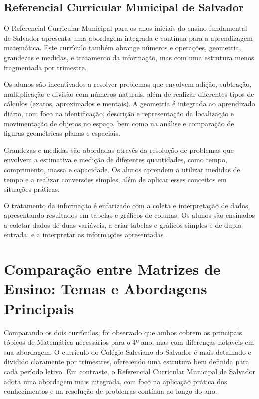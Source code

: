 \subsection{Referencial Curricular Municipal de Salvador}

O Referencial Curricular Municipal para os anos iniciais do ensino fundamental de Salvador apresenta uma abordagem integrada e contínua para a aprendizagem matemática. Este currículo também abrange números e operações, geometria, grandezas e medidas, e tratamento da informação, mas com uma estrutura menos fragmentada por trimestre.

Os alunos são incentivados a resolver problemas que envolvem adição, subtração, multiplicação e divisão com números naturais, além de realizar diferentes tipos de cálculos (exatos, aproximados e mentais). A geometria é integrada ao aprendizado diário, com foco na identificação, descrição e representação da localização e movimentação de objetos no espaço, bem como na análise e comparação de figuras geométricas planas e espaciais.

Grandezas e medidas são abordadas através da resolução de problemas que envolvem a estimativa e medição de diferentes quantidades, como tempo, comprimento, massa e capacidade. Os alunos aprendem a utilizar medidas de tempo e a realizar conversões simples, além de aplicar esses conceitos em situações práticas.

O tratamento da informação é enfatizado com a coleta e interpretação de dados, apresentando resultados em tabelas e gráficos de colunas. Os alunos são ensinados a coletar dados de duas variáveis, a criar tabelas e gráficos simples e de dupla entrada, e a interpretar as informações apresentadas \cite{referencial_curricular_municipal}.

\section{Comparação entre Matrizes de Ensino: Temas e Abordagens Principais}

Comparando os dois currículos, foi observado que ambos cobrem os principais tópicos de Matemática necessários para o 4º ano, mas com diferenças notáveis em sua abordagem. O currículo do Colégio Salesiano do Salvador é mais detalhado e dividido claramente por trimestres, oferecendo uma estrutura bem definida para cada período letivo. Em contraste, o Referencial Curricular Municipal de Salvador adota uma abordagem mais integrada, com foco na aplicação prática dos conhecimentos e na resolução de problemas contínua ao longo do ano.

